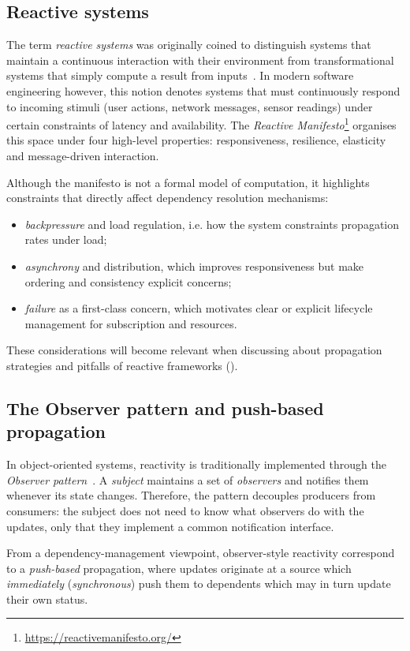 \subsection{Reactive systems}
The term \emph{reactive systems} was originally coined to distinguish systems
that  maintain a continuous interaction with their environment from
transformational systems that simply compute a result from
inputs~\cite{harel1989DRS}. In modern software engineering however, this notion
denotes systems that must continuously respond to incoming stimuli (user
actions, network messages, sensor readings) under certain constraints of
latency and availability. The \emph{Reactive Manifesto}\footnote{
	\url{https://reactivemanifesto.org/}} organises this space under four
high-level properties: responsiveness, resilience, elasticity and
message-driven interaction.

Although the manifesto is not a formal model of computation, it highlights
constraints that directly affect dependency resolution mechanisms:
\begin{itemize}
	\item \emph{backpressure} and load regulation, i.e. how the system
	      constraints propagation rates under load;
	\item \emph{asynchrony} and distribution, which improves responsiveness but
	      make ordering and consistency explicit concerns;
	\item \emph{failure} as a first-class concern, which motivates clear or
	      explicit lifecycle management for subscription and resources.
\end{itemize}
These considerations will become relevant when discussing about propagation strategies
and pitfalls of reactive frameworks ().

\subsection{The Observer pattern and push-based propagation}
In object-oriented systems, reactivity is traditionally implemented through the
\emph{Observer pattern}~\cite{gamma1994design}. A \emph{subject} maintains a
set of \emph{observers} and notifies them whenever its state changes.
Therefore, the pattern decouples producers from consumers: the subject does not
need to know what observers do with the updates, only that they implement a
common notification interface.

From a dependency-management viewpoint, observer-style reactivity correspond to
a \emph{push-based} propagation, where updates originate at a source which
\emph{immediately} (\emph{synchronous}) push them to dependents which may in
turn update their own status.

